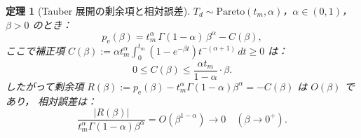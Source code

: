 \documentclass[12pt,a4paper]{article}
\theoremstyle{plain}
\newtheorem{theorem}{定理}[section]
\theoremstyle{definition}
\theoremstyle{remark}
\newcommand{\pe}{p_{\mathrm{e}}}
\begin{document}
\begin{theorem}[Tauber 展開の剰余項と相対誤差]\label{thm:remainder}
$T_d\sim\mathrm{Pareto}(t_m,\alpha)$，$\alpha\in(0,1)$，$\beta>0$ のとき：
\begin{equation}\label{eq:pe_tauber}
\pe(\beta)=t_m^\alpha\,\Gamma(1-\alpha)\,\beta^\alpha - C(\beta),
\end{equation}
ここで補正項 $C(\beta):=\alpha t_m^\alpha\int_0^{t_m}(1-e^{-\beta t})t^{-(\alpha+1)}\,dt\ge0$ は：
\begin{equation}\label{eq:C_bound}
0\le C(\beta)\le\frac{\alpha t_m}{1-\alpha}\cdot\beta.
\end{equation}
したがって剰余項 $R(\beta):=\pe(\beta)-t_m^\alpha\Gamma(1-\alpha)\beta^\alpha=-C(\beta)$ は $O(\beta)$ であり，
相対誤差は：
\[
\frac{|R(\beta)|}{t_m^\alpha\Gamma(1-\alpha)\beta^\alpha}
=O(\beta^{1-\alpha})\to0\quad(\beta\to0^+).
\]
\end{theorem}
\end{document}
